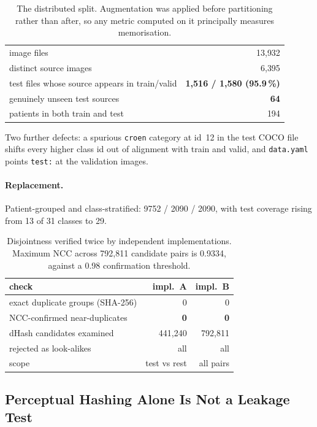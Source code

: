 \documentclass[10pt,twocolumn,letterpaper]{article}
\begin{document}
\begin{table}[t]
\centering\small
\begin{tabular}{lr}
\toprule
image files & 13{,}932 \\
distinct source images & 6{,}395 \\
test files whose source appears in train/valid & \textbf{1{,}516 / 1{,}580 (95.9\,\%)} \\
genuinely unseen test sources & \textbf{64} \\
patients in both train and test & 194 \\
\bottomrule
\end{tabular}
\caption{The distributed split. Augmentation was applied before partitioning
rather than after, so any metric computed on it principally measures
memorisation.}
\end{table}

Two further defects: a spurious \texttt{croen} category at id~12 in the test
COCO file shifts every higher class id out of alignment with train and valid,
and \texttt{data.yaml} points \texttt{test:} at the validation images.

\paragraph{Replacement.}
Patient-grouped and class-stratified: 9752 / 2090 / 2090, with test coverage
rising from 13 of 31 classes to 29.

\begin{table}[t]
\centering\small
\begin{tabular}{lrr}
\toprule
check & impl.~A & impl.~B \\
\midrule
exact duplicate groups (SHA-256) & 0 & 0 \\
NCC-confirmed near-duplicates & \textbf{0} & \textbf{0} \\
dHash candidates examined & 441{,}240 & 792{,}811 \\
rejected as look-alikes & all & all \\
scope & test vs rest & all pairs \\
\bottomrule
\end{tabular}
\caption{Disjointness verified twice by independent implementations. Maximum
NCC across 792{,}811 candidate pairs is 0.9334, against a 0.98 confirmation
threshold.}
\end{table}

\subsection{Perceptual Hashing Alone Is Not a Leakage Test}
\end{document}
